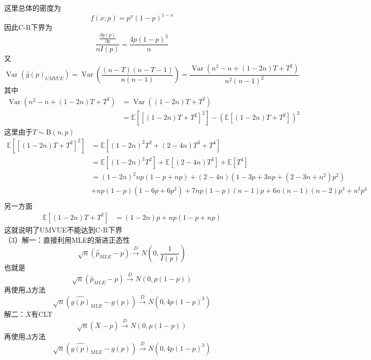 \documentclass[UTF8]{ctexart}
\begin{document}
这里总体的密度为
\[
f(x ; p)=p^x(1-p)^{1-x}
\]
因此C-R下界为
\[
\frac{\frac{\partial g(p)}{\partial p}}{n I(p)}=\frac{4 p(1-p)^3}{n}
\]
又
\[
\operatorname{Var}(\hat{g}(p)_{UMVUE} )=\operatorname{Var}\left(\frac{(n-T)(n-T-1)}{n(n-1)}\right) =\frac{\operatorname{Var}\left(n^2-n+(1-2n)T+T^2\right)}{n^2(n-1)^2}
\]
其中
\begin{align*}
	\operatorname{Var}\left(n^2-n+(1-2n)T+T^2\right) & =\operatorname{Var}\left((1-2n)T+T^2\right) \\
	 & =\mathbb{E}\left[\left[(1-2 n) T+T^2\right]^2\right]-\left(\mathbb{E}\left[(1-2 n) T+T^2\right]\right)^2
\end{align*}
这里由于$T\sim \mathrm{B}(n,p)$
\begin{align*}
	\mathbb{E}\left[\left[(1-2 n) T+T^2\right]^2\right] & =\mathbb{E}\left[(1-2n)^2 T^2 +(2-4n)T^3+T^4 \right]  \\
	& =\mathbb{E}\left[(1-2n)^2 T^2 \right] +\mathbb{E}\left[(2-4n)T^3 \right] +\mathbb{E}\left[T^4 \right] \\
	&=(1-2n)^2 np(1-p+np)+(2-4n)(1-3p+3np+(2-3n+n^2)p^2)\\
	&+np(1-p)(1-6p+6p^2)+7np(1-p)(n-1)p+6n(n-1)(n-2)p^3+n^3p^4\\
\end{align*}
另一方面
\begin{align*}
	\mathbb{E}\left[(1-2 n) T+T^2\right] & =(1-2n)p+np(1-p+np) 
\end{align*}
这就说明了UMVUE不能达到C-R下界\\
（3）解一：直接利用MLE的渐进正态性
\[
\sqrt{n}\left(\hat{p}_{MLE}-p \right)\xrightarrow{D} N \left(0,\frac{1}{I(p)} \right) 
\]
也就是
\[
\sqrt{n}\left(\hat{p}_{MLE}-p \right)\xrightarrow{D} N \left(0,p(1-p) \right) 
\]
再使用$\Delta$方法
\[
\sqrt{n}\left(\hat{g(p)}_{MLE}-g(p) \right)\xrightarrow{D} N \left(0,4p(1-p)^3 \right) 
\]
解二：$\overline{X}$有CLT
\[
\sqrt{n}\left(\overline{X}-p \right)\xrightarrow{D} N \left(0,p(1-p) \right) 
\]
再使用$\Delta$方法
\[
\sqrt{n}\left(\hat{g(p)}_{MLE}-g(p) \right)\xrightarrow{D} N \left(0,4p(1-p)^3 \right) 
\]\\
\end{document}
